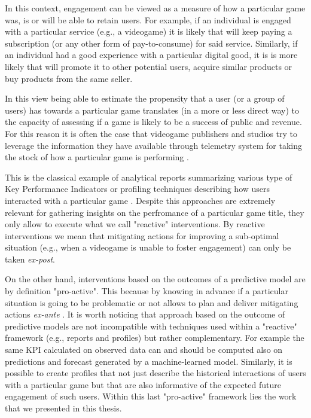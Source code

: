 In this context, engagement can be viewed as a measure of how a particular game was, is or will be able to retain users. For example, if an individual is engaged with a particular service (e.g., a videogame) it is likely that will keep paying a subscription (or any other form of pay-to-consume) for said service. Similarly, if an individual had a good experience with a particular digital good, it is is more likely that will promote it to other potential users, acquire similar products or buy products from the same seller.  

In this view being able to estimate the propensity that a user (or a group of users) has towards a particular game translates (in a more or less direct way) to the capacity of assessing if a game is likely to be a success of public and revenue. For this reason it is often the case that videogame publishers and studios try to leverage the information they have available through telemetry system for taking the stock of how a particular game is performing \cite{el2016game}. 

This is the classical example of analytical reports summarizing various type of Key Performance Indicators \cite{el2016game} or profiling techniques describing how users interacted with a particular game \cite{el2016game}. Despite this approaches are extremely relevant for gathering insights on the perfromance of a particular game title, they only allow to execute what we call "reactive" interventions. By reactive interventions we mean that mitigating actions for improving a sub-optimal situation (e.g., when a videogame is unable to foster engagement) can only be taken \textit{ex-post}.

On the other hand, interventions based on the outcomes of a predictive model are by definition "pro-active". This because by knowing in advance if a particular situation is going to be problematic or not allows to plan and deliver mitigating actions \textit{ex-ante} \cite{el2016game, el2021game}. It is worth noticing that approach based on the outcome of predictive models are not incompatible with techniques used within a "reactive" framework (e.g., reports and profiles) but rather complementary. For example the same KPI calculated on observed data can and should be computed also on predictions and forecast generated by a machine-learned model. Similarly, it is possible to create profiles that not just describe the historical interactions of users with a particular game but that are also informative of the expected future engagement of such users. Within this last "pro-active" framework lies the work that we presented in this thesis. 

